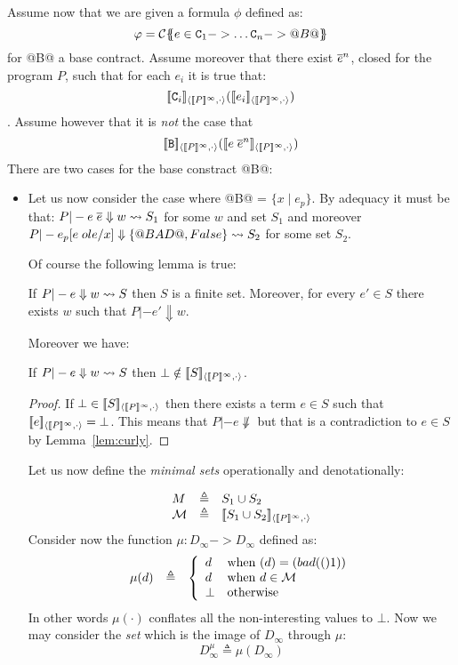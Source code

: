 Assume now that we are given a formula $\phi$ defined as:
\[  \varphi = {\cal C}\{\!\!\{e \in {\tt C}_1 -> \ldots {\tt C}_n -> @B@\}\!\!\} \]
for @B@ a base contract. Assume moreover that there exist $\overline{e}^{n}$, closed for the
program $P$, such that for each $e_i$ it is true that:
\[\interp{\Ct_i}{\dbrace{P}^\infty}{\cdot}(\interp{e_i}{\dbrace{P}^\infty}{\cdot})\].
Assume however that it is {\em not} the case that
\[\interp{{\tt B}}{\dbrace{P}^\infty}{\cdot}(\interp{e\;\oln{e}{n}}{\dbrace{P}^\infty}{\cdot})\]
There are two cases for the base constract @B@:
\begin{itemize}
  \item Let us now consider the case where @B@ = $\{ x \mid e_p \}$. By adequacy it must
  be that: $P |- e\;\overline{e} \Downarrow w \rightsquigarrow S_1$ for some $w$ and set $S_1$ and moreover
  $P |- e_p[e\;ol{e}/x] \Downarrow \{ @BAD@, False \} \rightsquigarrow S_2$ for some set $S_2$.

  Of course the following lemma is true:
  \begin{lemma}\label{lem:curly}
    If $P |- e \Downarrow w \rightsquigarrow S$ then $S$ is a finite set. Moreover,
    for every $e' \in S$ there exists $w$ such that $P |- e' \Downarrow w$.
  \end{lemma}
  Moreover we have:
  \begin{lemma}\label{lem:bot-not-redex}
     If $P |- e \Downarrow w \rightsquigarrow S$ then
     $\bot \notin [\![S]\!]_{\langle {[\![P]\!]^{\infty}},{\cdot}\rangle}$.
  \end{lemma}
  \begin{proof} If $\bot \in [\![S]\!]_{\langle {[\![P]\!]^{\infty}},{\cdot}\rangle}$ then there exists
  a term $e \in S$ such that $[\![e]\!]_{\langle {[\![P]\!]^{\infty}},{\cdot}\rangle} = \bot$. This means
  that $P |- e \not\Downarrow$ but that is a contradiction to $e \in S$ by
  Lemma~\ref{lem:curly}.
  \end{proof}

  Let us now define the {\em minimal sets} operationally and denotationally:

  \[\begin{array}{lcl}
           M        & \triangleq & S_1 \cup S_2 \\
           {\cal M} & \triangleq & [\![S_1\cup S_2]\!]_{\langle {[\![P]\!]^{\infty}},{\cdot}\rangle}
  \end{array}\]
  Consider now the function $\mu : D_\infty -> D_\infty$ defined as:
  \[\begin{array}{lcl}
        \mu(d) & \triangleq & \left\{ \begin{array}{ll}
                   d           & \mbox{when } (d) = ({bad}(()1)) \\
                   d           & \mbox{when } d \in \cal M \\
                   \bot        & \mbox{otherwise }
                                      \end{array}\right.
  \end{array}\]
  In other words $\mu(\cdot)$ conflates all the non-interesting values to $\bot$.
  Now we may consider the {\em set} which is the image of $D_\infty$ through $\mu$:
  \[ D_\infty^\mu  \triangleq \mu(D_\infty) \]


\end{itemize}
